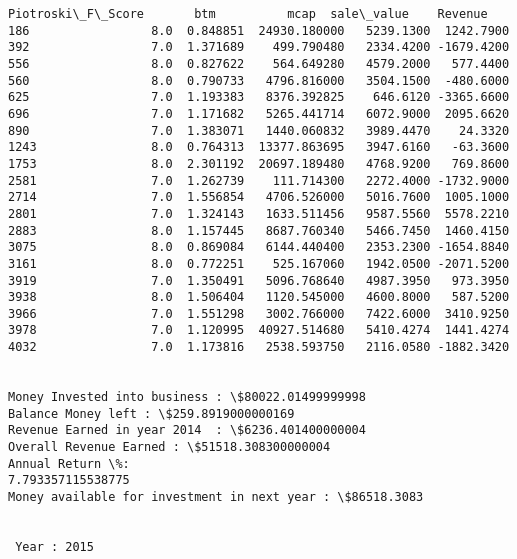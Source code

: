 \documentclass[11pt]{article}
\begin{document}
\begin{Verbatim}[commandchars=\\\{\}]
      Piotroski\_F\_Score       btm          mcap  sale\_value    Revenue
186                 8.0  0.848851  24930.180000   5239.1300  1242.7900
392                 7.0  1.371689    499.790480   2334.4200 -1679.4200
556                 8.0  0.827622    564.649280   4579.2000   577.4400
560                 8.0  0.790733   4796.816000   3504.1500  -480.6000
625                 7.0  1.193383   8376.392825    646.6120 -3365.6600
696                 7.0  1.171682   5265.441714   6072.9000  2095.6620
890                 7.0  1.383071   1440.060832   3989.4470    24.3320
1243                8.0  0.764313  13377.863695   3947.6160   -63.3600
1753                8.0  2.301192  20697.189480   4768.9200   769.8600
2581                7.0  1.262739    111.714300   2272.4000 -1732.9000
2714                7.0  1.556854   4706.526000   5016.7600  1005.1000
2801                7.0  1.324143   1633.511456   9587.5560  5578.2210
2883                8.0  1.157445   8687.760340   5466.7450  1460.4150
3075                8.0  0.869084   6144.440400   2353.2300 -1654.8840
3161                8.0  0.772251    525.167060   1942.0500 -2071.5200
3919                7.0  1.350491   5096.768640   4987.3950   973.3950
3938                8.0  1.506404   1120.545000   4600.8000   587.5200
3966                7.0  1.551298   3002.766000   7422.6000  3410.9250
3978                7.0  1.120995  40927.514680   5410.4274  1441.4274
4032                7.0  1.173816   2538.593750   2116.0580 -1882.3420


Money Invested into business : \$80022.01499999998
Balance Money left : \$259.8919000000169
Revenue Earned in year 2014  : \$6236.401400000004
Overall Revenue Earned : \$51518.308300000004
Annual Return \%:
7.793357115538775
Money available for investment in next year : \$86518.3083


 Year : 2015


\end{Verbatim}
\end{document}
